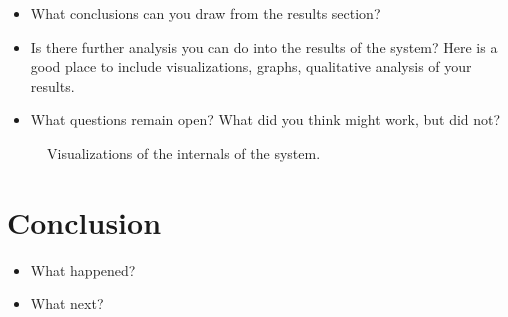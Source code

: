 \documentclass{article}
\begin{document}
\begin{itemize}
\item What conclusions can you draw from the results section?
\item Is there further analysis you can do into the results of the system? Here is a good place to include visualizations, graphs, qualitative analysis of your results.

\item What questions remain open? What did you think might work, but did not?
\end{itemize}


\begin{figure}
  \centering
  \missingfigure{}
  \missingfigure{}
  \missingfigure{}
  \caption{Visualizations of the internals of the system.}
\end{figure}

\section{Conclusion}

\begin{itemize}
\item What happened?
\item What next?
\end{itemize}








\end{document}
